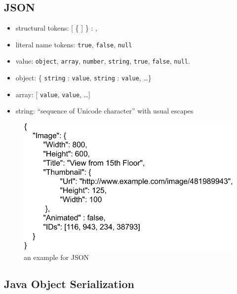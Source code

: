 \documentclass[twocolumn,landscape,10pt]{article}
\theoremstyle{definition}
\begin{document}
\subsection{JSON}

\begin{itemize}
    \item structural tokens: [ \{ ] \} : ,
    \item literal name tokens: \texttt{true}, \texttt{false}, \texttt{null}
    \item value: \texttt{object}, \texttt{array}, \texttt{number},
        \texttt{string}, \texttt{true}, \texttt{false}, \texttt{null}.
    \item object: \{ \texttt{string} : \texttt{value}, \texttt{string} : \texttt{value}, \ldots\}
    \item array: [ \texttt{value}, \texttt{value}, \ldots]
    \item string: ``\textlangle sequence of Unicode character\textrangle'' with usual escapes
\end{itemize} 

\begin{figure}[h]
  	\includegraphics[scale=0.3]{JSON.png}
  	\centering
    \caption{an example for JSON}
\end{figure}


\subsection{Java Object Serialization}
\end{document}
